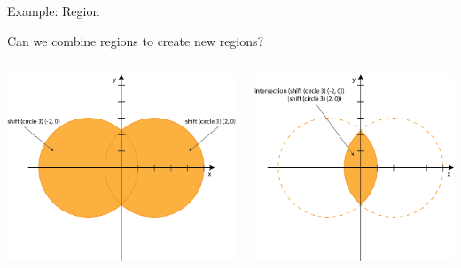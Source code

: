 \documentclass[8pt,aspectratio=169]{beamer}
\begin{document}
\begin{frame}[fragile]{Example: Region}

Can we combine regions to create new regions?

\begin{columns}[onlytextwidth]
\begin{column}{0.5\textwidth}
\pause
\begin{center}
\includegraphics[scale=0.22]{figures/intersectionRegion1}
\end{center}
\end{column}
\begin{column}{0.5\textwidth}
\pause
\begin{center}
\includegraphics[scale=0.22]{figures/intersectionRegion2}
\end{center}
\end{column}
\end{columns}


\end{frame}
\end{document}
